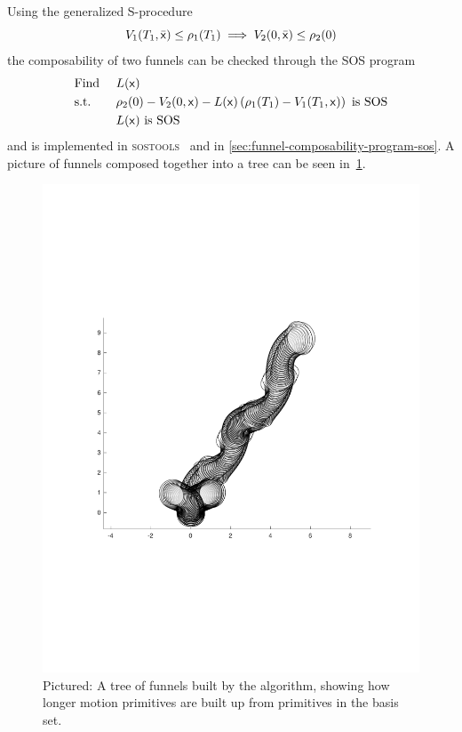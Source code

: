 Using the generalized S-procedure
\begin{equation}
  V_1(T_1,\bar{{\mathbf{\mathsf{x}}}}) \leq \rho_1(T_1) \implies V_2(0, \bar{{\mathbf{\mathsf{x}}}}) \leq \rho_2(0)
\end{equation}
the composability of two funnels can be checked through the \ac{SOS} program
\begin{align}
  & \text{Find } && L({\mathbf{\mathsf{x}}}) \\
  & \text{s.t. } && \rho_2(0) - V_2(0,{\mathbf{\mathsf{x}}}) - L({\mathbf{\mathsf{x}}})\left( \rho_1(T_1) - V_1(T_1,{\mathbf{\mathsf{x}}}) \right) \text{ is SOS} \nonumber \\ 
  &&& L({\mathbf{\mathsf{x}}}) \text{ is SOS} \nonumber
\end{align}
and is implemented in \textsc{sostools}~\cite{sostools} and \matlab{} in
\cref{sec:funnel-composability-program-sos}. A picture of funnels composed
together into a tree can be seen in~\cref{fig:funnel-composition-tree}.
\begin{figure}
  \centering \includegraphics[scale=.5, trim={0cm 7cm 0cm
    7cm}]{figures/method/funnel-tree} \caption{Pictured: A tree of funnels built
    by the \rrtfunnel{} algorithm, showing how longer motion primitives are
    built up from primitives in the basis set.}
  \label{fig:funnel-composition-tree}
\end{figure}

